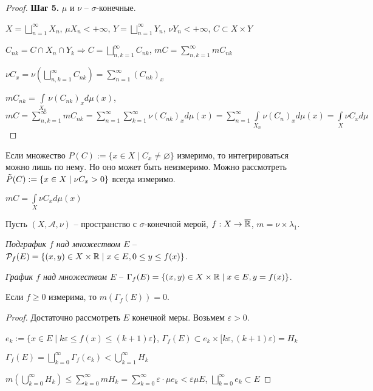 \begin{proof}
    \textbf{Шаг 5.} $\mu$ и $\nu$ – $\sigma$-конечные.

    $X=\bigsqcup\limits_{n=1}^\infty X_n$, $\mu X_n<+\infty$, $Y=\bigsqcup\limits_{n=1}^\infty Y_n$, $\nu Y_n<+\infty$, $C\subset X\times Y$

    $C_{nk}=C\cap X_n \cap Y_k\Rightarrow C= \bigsqcup\limits_{n,k=1}^\infty C_{nk}$, $mC= \sum\limits_{n,k=1}^\infty mC_{nk}$

    $\nu C_x =\nu (\bigsqcup\limits_{n, k=1}^\infty C_{nk})=\sum\limits_{n=1}^\infty (C_{nk})_x$

    $mC_{nk}=\int \limits_{X_n} \nu (C_{nk})_x d\mu (x)$, $mC = \sum \limits_{n, k=1}^\infty m C_{nk}=
    \sum \limits_{n=1}^\infty\sum \limits_{k=1}^\infty \nu (C_{nk})_x d\mu (x)=\sum \limits_{n=1}^\infty \int\limits_{X_n} \nu (C_n)_x d\mu (x)
    =\int\limits_{X} \nu C_x d\mu$
\end{proof}

\begin{remark}
    Если множество $P(C):= \{x\in X\mid C_x\not=\varnothing\}$ измеримо, то интегрироваться можно лишь по нему. Но оно может быть
    неизмеримо. Можно рассмотреть $\Tilde{P}(C):= \{x\in X\mid \nu C_x>0\}$ всегда измеримо.

    $mC = \int\limits_X \nu C_x d\mu (x)$
\end{remark}

\begin{definition}
    Пусть $(X, \mathcal{A}, \nu)$ – пространство с $\sigma$-конечной мерой, $f: X\rightarrow \overline{\mathbb{R}}$, 
    $m=\nu \times\lambda_1$. 
    
    \textit{Подграфик $f$ над множеством $E$} – $\mathcal{P}_f(E)=\{ (x, y)\in X\times \mathbb{R}\mid 
    x\in E, 0\leq y \leq f(x)\}$.

    \textit{График $f$ над множеством $E$} – $\Gamma_f(E)=\{ (x, y)\in X\times \mathbb{R}\mid 
    x\in E, y = f(x)\}$.
\end{definition}

\begin{lemma}
    Если $f\geq 0$ измерима, то $m(\Gamma_f(E))=0$.
\end{lemma}

\begin{proof}
    Достаточно рассмотреть $E$ конечной меры. Возьмем $\varepsilon > 0$.

    $e_k:= \{x\in E\mid k\varepsilon \leq f(x)\leq (k+1)\varepsilon\}$, $\Gamma_f(E) \subset e_k\times 
    [k\varepsilon, (k+1)\varepsilon)=H_k$

    $\Gamma_f(E) =\bigsqcup\limits_{k=0}^\infty \Gamma_f(e_k)< \bigcup\limits_{k=1}^\infty H_k$

    $m(\bigcup\limits_{k=0}^\infty H_k) \leq \sum\limits_{k=0}^\infty mH_k=\sum\limits_{k=0}^\infty 
    \varepsilon \cdot \mu e_k < \varepsilon \mu E$, $\bigsqcup\limits_{k=0}^\infty e_k\subset E$
\end{proof}

